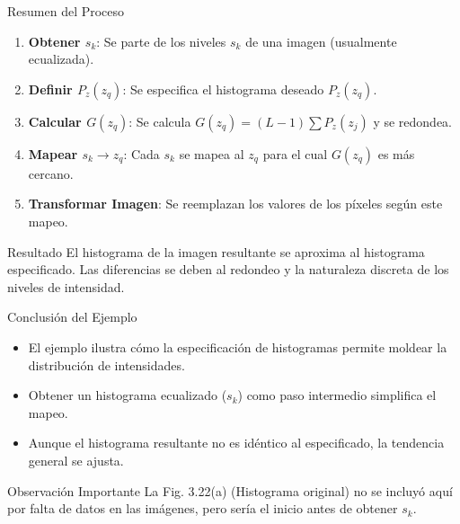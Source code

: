 \documentclass{beamer}
\begin{document}
\begin{frame}{Resumen del Proceso}
\footnotesize %
  \begin{enumerate}
    \item \textbf{Obtener $s_k$}: Se parte de los niveles $s_k$ de una imagen (usualmente ecualizada).
    \item \textbf{Definir $P_z(z_q)$}: Se especifica el histograma deseado $P_z(z_q)$.
    \item \textbf{Calcular $G(z_q)$}: Se calcula $G(z_q) = (L-1) \sum P_z(z_j)$ y se redondea.
    \item \textbf{Mapear $s_k \rightarrow z_q$}: Cada $s_k$ se mapea al $z_q$ para el cual $G(z_q)$ es más cercano.
    \item \textbf{Transformar Imagen}: Se reemplazan los valores de los píxeles según este mapeo.
  \end{enumerate}

  \begin{alertblock}{Resultado}
    El histograma de la imagen resultante se aproxima al histograma especificado. Las diferencias se deben al redondeo y la naturaleza discreta de los niveles de intensidad.
  \end{alertblock}
\end{frame}

\begin{frame}{Conclusión del Ejemplo}
\footnotesize %
  \begin{itemize}
    \item El ejemplo ilustra cómo la especificación de histogramas permite moldear la distribución de intensidades.
    \item Obtener un histograma ecualizado ($s_k$) como paso intermedio simplifica el mapeo.
    \item Aunque el histograma resultante no es idéntico al especificado, la tendencia general se ajusta.
  \end{itemize}
  \begin{block}{Observación Importante}
    La Fig. 3.22(a) (Histograma original) no se incluyó aquí por falta de datos en las imágenes, pero sería el inicio antes de obtener $s_k$.
  \end{block}
\end{frame}

\end{document}
